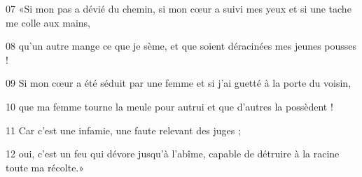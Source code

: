
07 «Si mon pas a dévié du chemin, si mon cœur a suivi mes yeux et si une tache me colle aux mains,

08 qu’un autre mange ce que je sème, et que soient déracinées mes jeunes pousses !

09 Si mon cœur a été séduit par une femme et si j’ai guetté à la porte du voisin,

10 que ma femme tourne la meule pour autrui et que d’autres la possèdent !

11 Car c’est une infamie, une faute relevant des juges ;

12 oui, c’est un feu qui dévore jusqu’à l’abîme, capable de détruire à la racine toute ma récolte.»
